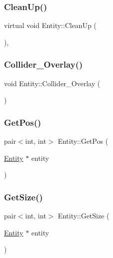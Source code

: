\subsubsection{\texorpdfstring{CleanUp()}{CleanUp()}}
{\footnotesize\ttfamily virtual void Entity\+::\+Clean\+Up (\begin{DoxyParamCaption}{ }\end{DoxyParamCaption})\hspace{0.3cm}{\ttfamily [inline]}, {\ttfamily [virtual]}}

\mbox{\label{class_entity_a7cf26e6c6c826afb27a9c6e37cf360e8}} 
\subsubsection{\texorpdfstring{Collider\_Overlay()}{Collider\_Overlay()}}
{\footnotesize\ttfamily void Entity\+::\+Collider\+\_\+\+Overlay (\begin{DoxyParamCaption}{ }\end{DoxyParamCaption})}

\mbox{\label{class_entity_a6fefca09c3b16691e9a92445f4f9e203}} 
\subsubsection{\texorpdfstring{GetPos()}{GetPos()}}
{\footnotesize\ttfamily pair$<$int, int$>$ Entity\+::\+Get\+Pos (\begin{DoxyParamCaption}\item[{\mbox{\hyperlink{class_entity}{Entity}} $\ast$}]{entity }\end{DoxyParamCaption})\hspace{0.3cm}{\ttfamily [inline]}}

\mbox{\label{class_entity_aa74de5c59a3aafcb65c1388838929f03}} 
\subsubsection{\texorpdfstring{GetSize()}{GetSize()}}
{\footnotesize\ttfamily pair$<$int, int$>$ Entity\+::\+Get\+Size (\begin{DoxyParamCaption}\item[{\mbox{\hyperlink{class_entity}{Entity}} $\ast$}]{entity }\end{DoxyParamCaption})\hspace{0.3cm}{\ttfamily [inline]}}

